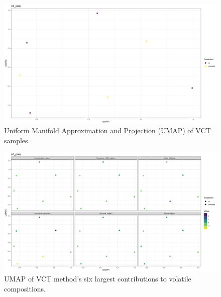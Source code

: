 \documentclass[12pt,final,CPage]{ufthesis}
\begin{document}
{\begin{figure}
  {\centering \includegraphics[width=1\linewidth]{figure/rrv_volatiles_umap_rrd_qsep} 

  }

  \caption[Uniform Manifold Approximation and Projection (UMAP) of VCT samples]{Uniform Manifold Approximation and Projection (UMAP) of VCT samples.}\label{fig:qsep-vocs-umap}
  \end{figure}
  \begin{figure}

  {\centering \includegraphics[width=1\linewidth]{figure/rrv_volatiles_umap_chems_rrd_qsep} 

  }

  \caption[UMAP of VCT method's six largest contributions to volatile compositions]{UMAP of VCT method's six largest contributions to volatile compositions.}\label{fig:qsep-vocs-umap-chems}
  \end{figure}
  \begin{table}


\end{table}}
\end{document}
